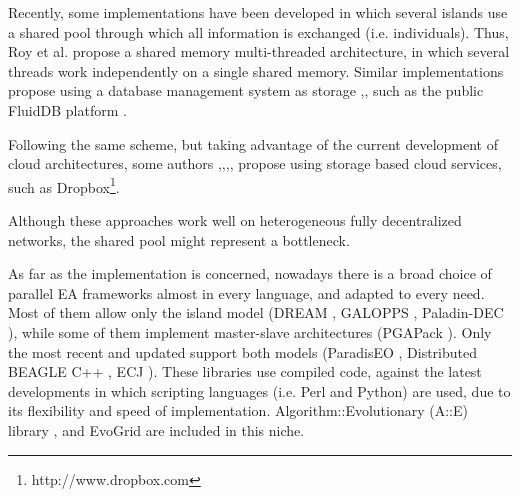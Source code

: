 \documentclass[final,1p,times]{elsarticle}
\begin{document}
Recently, some implementations have been developed in which several islands use a shared pool through which all information is exchanged (i.e. individuals).
Thus, Roy et al. \cite{Roy2009} propose a shared memory multi-threaded architecture, in which several threads work independently on a single shared memory.
Similar implementations propose using a database management system as storage
\cite{Bollini1999},\cite{Merelo2008}, such as the public FluidDB platform \cite{Merelo2010}.

Following the same scheme, but taking advantage of the current development of cloud architectures, some authors 
\cite{Andrzejak2010},\cite{Atkinson2010},\cite{Arenas2011a},\cite{Arenas2011b},\cite{Arenas2011c} propose using storage based cloud services, such as Dropbox\footnote{http://www.dropbox.com}.

Although these approaches work well on heterogeneous fully decentralized networks, the shared pool might represent a bottleneck.


As far as the implementation is concerned, nowadays there is a broad choice of parallel EA frameworks almost in every language, and adapted to every need.
Most of them allow only the island model (DREAM \cite{dream2000,LNCS2439:ID197:pp665}, GALOPPS \cite{Goodman1996}, Paladin-DEC \cite{Tan2003}), while some of them implement master-slave architectures (PGAPack \cite{citeulike:889804}).
Only the most recent and updated support both models (ParadisEO \cite{Cahon2004}, Distributed BEAGLE C++ \cite{Dubreuil2006}, ECJ \cite{ecj2012}).
These libraries use compiled code, against the latest developments in which scripting languages ​​(i.e. Perl and Python) are used, due to its flexibility and speed of implementation.
Algorithm::Evolutionary (A::E) library \cite{perl-ea},\cite{jjSOCO2010} and EvoGrid \cite{EvoGrid2012} are included in this niche.
\end{document}
